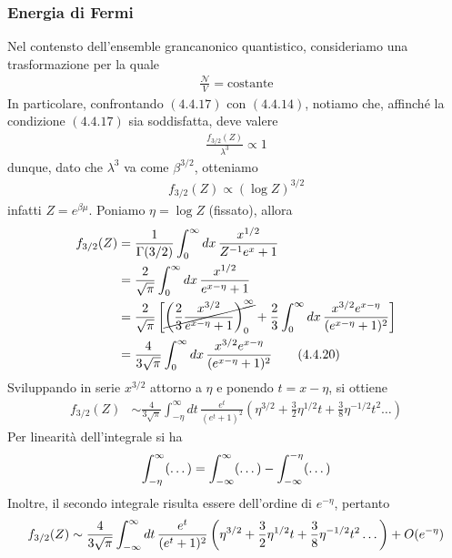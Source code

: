 \documentclass{article}
\begin{document}
\subsubsection*{Energia di Fermi}
Nel contensto dell'ensemble grancanonico quantistico, consideriamo una trasformazione per la quale 
\begin{align}
    \frac{\mathcal{N}}{V} = \text{costante} \tag{4.4.17}
\end{align}
In particolare, confrontando $(4.4.17)$ con $(4.4.14)$, notiamo che, affinché la condizione $(4.4.17)$ sia soddisfatta, deve valere 
\begin{align}
    \frac{f_{3/2}(Z)}{\lambda^3} \propto 1 \tag{4.4.18}
\end{align}
dunque, dato che $\lambda^3$ va come $\beta^{3/2}$, otteniamo
\begin{align}
    f_{3/2}(Z) \propto (\log Z)^{3/2} \tag{4.4.19}
\end{align}
infatti $Z = e^{\beta\mu}$. Poniamo $\eta = \log Z$ (fissato), allora
\begin{align}
    f_{3/2}(Z) &= \frac{1}{\Gamma(3/2)}\int_0^\infty dx \, \frac{x^{1/2}}{Z^{-1}e^x + 1} \notag \\
    &= \frac{2}{\sqrt{\pi}}\int_0^\infty dx \, \frac{x^{1/2}}{e^{x - \eta} + 1} \notag \\
    &= \frac{2}{\sqrt{\pi}}\left[\cancel{\left(\frac{2}{3}\frac{x^{3/2}}{e^{x - \eta} + 1}\right)_0^\infty} + \frac{2}{3}\int_0^\infty dx \, \frac{x^{3/2}e^{x - \eta}}{(e^{x - \eta} + 1)^2}\right] \notag \\
    &= \frac{4}{3\sqrt{\pi}}\int_0^\infty dx \, \frac{x^{3/2}e^{x - \eta}}{(e^{x - \eta} + 1)^2} \tag{4.4.20}
\end{align}
Sviluppando in serie $x^{3/2}$ attorno a $\eta$ e ponendo $t = x - \eta$, si ottiene
\begin{align}
    f_{3/2}(Z) &\sim \frac{4}{3\sqrt{\pi}}\int_{-\eta}^\infty dt \, \frac{e^t}{(e^t + 1)^2}\left(\eta^{3/2} + \frac{3}{2}\eta^{1/2}t + \frac{3}{8}\eta^{-1/2}t^2 \dots\right) \tag{4.4.21}
\end{align}
Per linearità dell'integrale si ha
\begin{align}
    \int_{-\eta}^\infty(\dots) = \int_{-\infty}^\infty(\dots) - \int_{-\infty}^{-\eta}(\dots) \notag
\end{align}
Inoltre, il secondo integrale risulta essere dell'ordine di $e^{-\eta}$, pertanto
\begin{align}
    f_{3/2}(Z) \sim \frac{4}{3\sqrt{\pi}}\int_{-\infty}^\infty dt \, \frac{e^t}{(e^t + 1)^2}\left(\eta^{3/2} + \frac{3}{2}\eta^{1/2}t + \frac{3}{8}\eta^{-1/2}t^2 \dots\right) + O(e^{-\eta}) \notag
\end{align}
\end{document}
